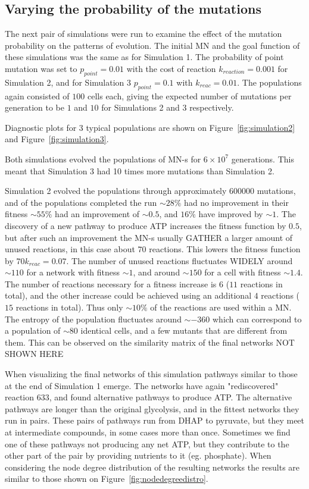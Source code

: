\documentclass[a4paper,12pt]{article}
\begin{document}
\subsection{Varying the probability of the mutations}
\label{sub:the_probability_of_the_mutations}

The next pair of simulations were run to examine the effect of the mutation probability on the patterns of evolution. The initial MN and the goal function of these simulations was the same as for Simulation 1. The probability of point mutation was set to $p_{point}=0.01$ with the cost of reaction $k_{reaction}=0.001$ for Simulation 2, and for Simulation 3 $p_{point}=0.1$ with $k_{reac}=0.01$. The populations again consisted of $100$ cells each, giving the expected number of mutations per generation to be $1$ and $10$ for Simulations 2 and 3 respectively. 

Diagnostic plots for $3$ typical populations are shown on Figure~\ref{fig:simulation2} and Figure~\ref{fig:simulation3}.

Both simulations evolved the populations of MN-s for $6\times 10^7$ generations. This meant that Simulation 3 had 10 times more mutations than Simulation 2. 

Simulation 2 evolved the populations through approximately $600 000$ mutations, and of the populations completed the run $\sim 28 \%$ had no improvement in their fitness $\sim 55 \%$ had an improvement of $\sim 0.5$, and $16 \%$ have improved by $\sim 1$. The discovery of a new pathway to produce ATP increases the fitness function by $0.5$, but after such an improvement the MN-s usually GATHER a larger amount of unused reactions, in this case about $70$ reactions. This lowers the fitness function by $70 k_{reac}=0.07$. The number of unused reactions fluctuates WIDELY around $\sim 110$ for a network with fitness $\sim 1$, and around $\sim 150$ for a cell with fitness $\sim 1.4$. The number of reactions necessary for a fitness increase is $6$ ($11$ reactions in total), and the other increase could be achieved using an additional $4$ reactions ($15$ reactions in total). Thus only $\sim 10\%$ of the reactions are used within a MN.  The entropy of the population fluctuates around $\sim -360$ which can correspond to a population of $\sim 80$ identical cells, and a few mutants that are different from them. This can be observed on the similarity matrix of the final networks NOT SHOWN HERE

When visualizing the final networks of this simulation pathways similar to those at the end of Simulation 1 emerge. The networks have again "rediscovered" reaction $633$, and found alternative pathways to produce ATP. The alternative pathways are longer than the original glycolysis, and in the fittest networks they run in pairs. These pairs of pathways run from DHAP to pyruvate, but they meet at intermediate compounds, in some cases more than once. Sometimes we find one of these pathways not producing any net ATP, but they contribute to the other part of the pair by providing nutrients to it (eg. phosphate). When considering the node degree distribution of the resulting networks the results are similar to those shown on Figure~\ref{fig:nodedegreedistro}. 
\end{document}
